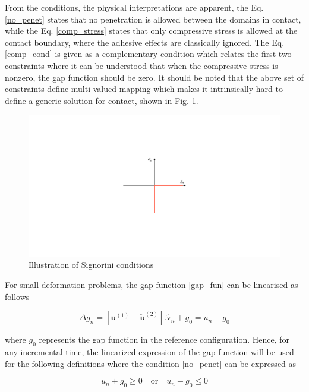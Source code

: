 From the conditions, the physical interpretations are apparent, the Eq. \eqref{no_penet} states that no penetration is allowed between the domains in contact, while the Eq. \eqref{comp_stress} states that only compressive stress is allowed at the contact boundary, where the adhesive effects are classically ignored. The Eq. \eqref{comp_cond}  is given as a complementary condition which relates the first two constraints where it can be understood that when the compressive stress is nonzero, the gap function should be zero. It should be noted that the above set of constraints define multi-valued mapping which makes it intrinsically hard to define a generic solution for contact, shown in Fig. \ref{fig:signori}.\\

\begin{figure}
    \centering
    \includegraphics[scale=0.43]{Chapter1/Pictures/signorini.pdf}
    \caption{Illustration of Signorini conditions}
    \label{fig:signori}
\end{figure}

For small deformation problems, the gap function \eqref{gap_fun} can be linearised as follows

\begin{equation}\label{gap_fun}
\Delta g_n = [\bm{u}^{(1)}-\overleftarrow{\bm{u}}^{(2)}].\bm{\hat{\mathrm v}}_{n}+g_0 = u_n+g_0
\end{equation}

where $g_0$ represents the gap function in the reference configuration. Hence, for any incremental time, the linearized expression of the gap function will be used for the following definitions where the condition \eqref{no_penet} can be expressed as  

\begin{equation}
u_n+g_0 \geq 0 \quad \mathrm{or} \quad u_n-g_0 \leq 0
 \end{equation}
 
